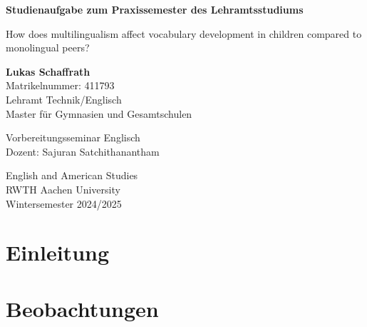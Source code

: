 \documentclass[12pt]{article}
\begin{document}
\begin{titlepage}
    \begin{center}
        \vspace*{0.5cm}
            
        \LARGE
        \textbf{Studienaufgabe zum Praxissemester des Lehramtsstudiums}
            
        \vspace{2cm}
        \Large
        How does multilingualism affect vocabulary development in children compared to monolingual peers?

        \vspace{2cm}
            
        \textbf{Lukas Schaffrath}\\
        Matrikelnummer: 411793\\
        Lehramt Technik/Englisch\\
        Master für Gymnasien und Gesamtschulen
            
        \vspace{2cm}
            
        Vorbereitungsseminar Englisch\\
        Dozent: Sajuran Satchithanantham
            
        \Large
        English and American Studies\\
        RWTH Aachen University\\
        Wintersemester 2024/2025\\
            
    \end{center}
\end{titlepage}




\newpage
\setcounter{page}{1}
\pagestyle{maintext}

\section{Einleitung}

\section{Beobachtungen}
\end{document}
